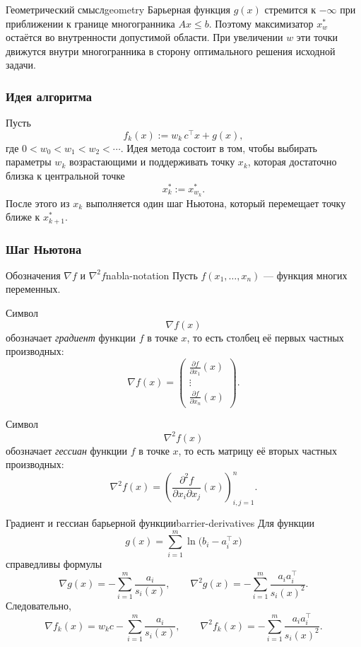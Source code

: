 \begin{Remark}{Геометрический смысл}{geometry}
	Барьерная функция \(g(x)\) стремится к \(-\infty\) при приближении к границе многогранника \(Ax \le b\).
	Поэтому максимизатор \(x_w^\ast\) остаётся во внутренности допустимой области.
	При увеличении \(w\) эти точки движутся внутри многогранника в сторону оптимального решения исходной задачи.
\end{Remark}

\subsubsection*{Идея алгоритма}

Пусть
\[
f_k(x) := w_k\, c^\top x + g(x),
\]
где \(0 < w_0 < w_1 < w_2 < \cdots\).
Идея метода состоит в том, чтобы выбирать параметры \(w_k\) возрастающими
и поддерживать точку \(x_k\), которая достаточно близка к центральной точке
\[
x_k^\ast := x_{w_k}^\ast.
\]
После этого из \(x_k\) выполняется один шаг Ньютона, который перемещает точку ближе к \(x_{k+1}^\ast\).

\subsubsection*{Шаг Ньютона}

\begin{Remark}{Обозначения \(\nabla f\) и \(\nabla^2 f\)}{nabla-notation}
	Пусть \(f(x_1,\dots,x_n)\) — функция многих переменных.
	
	Символ
	\[
	\nabla f(x)
	\]
	обозначает \emph{градиент} функции \(f\) в точке \(x\), то есть столбец её первых частных производных:
	\[
	\nabla f(x)=
	\begin{pmatrix}
		\frac{\partial f}{\partial x_1}(x)\\
		\vdots\\
		\frac{\partial f}{\partial x_n}(x)
	\end{pmatrix}.
	\]
	
	Символ
	\[
	\nabla^2 f(x)
	\]
	обозначает \emph{гессиан} функции \(f\) в точке \(x\), то есть матрицу её вторых частных производных:
	\[
	\nabla^2 f(x)=
	\left(
	\frac{\partial^2 f}{\partial x_i \partial x_j}(x)
	\right)_{i,j=1}^n.
	\]
\end{Remark}

\begin{Proposition}{Градиент и гессиан барьерной функции}{barrier-derivatives}
	Для функции
	\[
	g(x) = \sum_{i=1}^m \ln \bigl(b_i - a_i^\top x\bigr)
	\]
	справедливы формулы
	\[
	\nabla g(x) = - \sum_{i=1}^m \frac{a_i}{s_i(x)},
	\qquad
	\nabla^2 g(x) = - \sum_{i=1}^m \frac{a_i a_i^\top}{s_i(x)^2}.
	\]
	Следовательно,
	\[
	\nabla f_k(x) = w_k c - \sum_{i=1}^m \frac{a_i}{s_i(x)},
	\qquad
	\nabla^2 f_k(x) = - \sum_{i=1}^m \frac{a_i a_i^\top}{s_i(x)^2}.
	\]
\end{Proposition}


